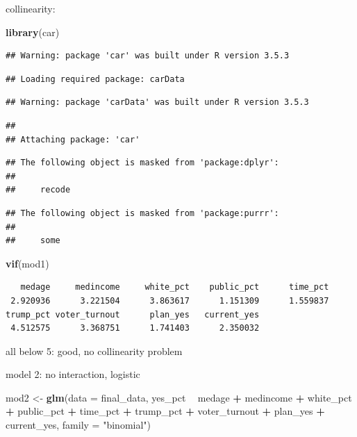 \documentclass[
]{article}
\newenvironment{Shaded}{\begin{snugshade}}{\end{snugshade}}
\newcommand{\DataTypeTok}[1]{\textcolor[rgb]{0.13,0.29,0.53}{#1}}
\newcommand{\KeywordTok}[1]{\textcolor[rgb]{0.13,0.29,0.53}{\textbf{#1}}}
\newcommand{\NormalTok}[1]{#1}
\newcommand{\OperatorTok}[1]{\textcolor[rgb]{0.81,0.36,0.00}{\textbf{#1}}}
\newcommand{\StringTok}[1]{\textcolor[rgb]{0.31,0.60,0.02}{#1}}
\begin{document}
collinearity:

\begin{Shaded}
\begin{Highlighting}[]
\KeywordTok{library}\NormalTok{(car)}
\end{Highlighting}
\end{Shaded}

\begin{verbatim}
## Warning: package 'car' was built under R version 3.5.3
\end{verbatim}

\begin{verbatim}
## Loading required package: carData
\end{verbatim}

\begin{verbatim}
## Warning: package 'carData' was built under R version 3.5.3
\end{verbatim}

\begin{verbatim}
## 
## Attaching package: 'car'
\end{verbatim}

\begin{verbatim}
## The following object is masked from 'package:dplyr':
## 
##     recode
\end{verbatim}

\begin{verbatim}
## The following object is masked from 'package:purrr':
## 
##     some
\end{verbatim}

\begin{Shaded}
\begin{Highlighting}[]
\KeywordTok{vif}\NormalTok{(mod1)}
\end{Highlighting}
\end{Shaded}

\begin{verbatim}
   medage     medincome     white_pct    public_pct      time_pct 
 2.920936      3.221504      3.863617      1.151309      1.559837 
trump_pct voter_turnout      plan_yes   current_yes 
 4.512575      3.368751      1.741403      2.350032 
\end{verbatim}

all below 5: good, no collinearity problem

model 2: no interaction, logistic

\begin{Shaded}
\begin{Highlighting}[]
\NormalTok{mod2 <-}\StringTok{ }\KeywordTok{glm}\NormalTok{(}\DataTypeTok{data =}\NormalTok{ final_data, yes_pct }\OperatorTok{~}\StringTok{ }\NormalTok{medage }\OperatorTok{+}\StringTok{ }\NormalTok{medincome }\OperatorTok{+}\StringTok{ }\NormalTok{white_pct }\OperatorTok{+}\StringTok{ }\NormalTok{public_pct }\OperatorTok{+}\StringTok{ }\NormalTok{time_pct }\OperatorTok{+}\StringTok{ }\NormalTok{trump_pct }\OperatorTok{+}\StringTok{ }\NormalTok{voter_turnout }\OperatorTok{+}\StringTok{ }\NormalTok{plan_yes }\OperatorTok{+}\StringTok{ }\NormalTok{current_yes, }\DataTypeTok{family =} \StringTok{"binomial"}\NormalTok{)}
\end{Highlighting}
\end{Shaded}
\end{document}
